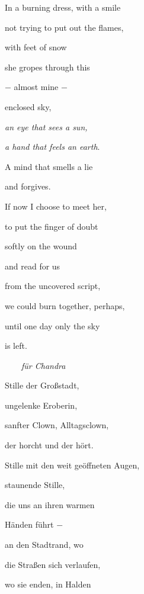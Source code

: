 \bigskip

In a burning dress, with a smile 

not trying to put out the flames,

with feet of snow


\bigskip

she gropes through this

$-$ almost mine $-$

enclosed sky,


\bigskip

\emph{
an eye that sees a sun,}

\emph{a hand that feels an earth}.

A mind that smells a lie


\bigskip

and forgives.

If now I choose to meet her,

to put the finger of doubt


\bigskip

softly on the wound

and read for us

from the uncovered script,


\bigskip

we could burn together, perhaps,

until one day only the sky 

is left.


\bigskip


\bigskip


\bigskip


\ \ \ \ \emph{für Chandra}


\bigskip

Stille der Großstadt,

ungelenke Eroberin,

sanfter Clown, Alltagsclown, 

der horcht und der hört.


\bigskip

Stille mit den weit geöffneten Augen,

staunende Stille,

die uns an ihren warmen

Händen führt $-$


\bigskip

an den Stadtrand, wo

die Straßen sich verlaufen,

wo sie enden, in Halden

